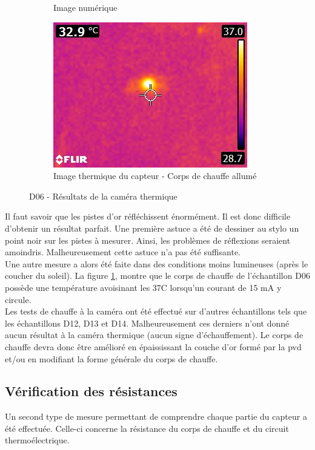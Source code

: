 \begin{figure}[H]
\begin{subfigure}{0.3\textwidth}
        \caption{Image numérique}
    \end{subfigure}
    \hspace{0.5cm}
    \begin{subfigure}{0.3\textwidth}
        \includegraphics[scale = 0.5]{assets/figures/thermique_avec_chauffe.jpg}
        \caption{Image thermique du capteur - Corps de chauffe allumé}
    \end{subfigure}
    \caption{D06 - Résultats de la caméra thermique}
    \label{fig:cameraThermique}
\end{figure}

Il faut savoir que les pistes d'or réfléchissent énormément. Il est donc difficile d'obtenir un résultat parfait. Une première astuce a été de
dessiner au stylo un point noir sur les pistes à mesurer. Ainsi, les problèmes de réflexions seraient amoindris. Malheureusement cette astuce n'a
pas été suffisante. \\

Une autre mesure a alors été faite dans des conditions moins lumineuses (après le coucher du soleil). La figure \ref*{fig:cameraThermique},
montre que le corps de chauffe de l'échantillon D06 possède une température avoisinant les 37\textdegree C lorsqu'un courant de 15 mA y circule. \\

Les tests de chauffe à la caméra ont été effectué sur d'autres échantillons tels que les échantillons D12, D13 et D14. Malheureusement ces derniers 
n'ont donné aucun résultat à la caméra thermique (aucun signe d'échauffement). Le corps de chauffe devra donc être amélioré en épaississant la 
couche d'or formé par la \gls{pvd} et/ou en modifiant la forme générale du corps de chauffe. 

\subsection{Vérification des résistances}
Un second type de mesure permettant de comprendre chaque partie du \gls{capteur} a été effectuée. Celle-ci concerne la résistance du corps de
chauffe et du circuit thermoélectrique.

